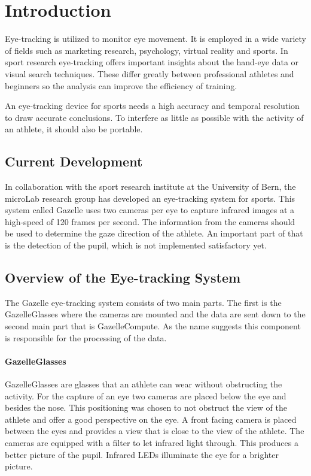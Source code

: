 \chapter{Introduction}

\label{chap:introduction}
Eye-tracking is utilized to monitor eye movement. It is employed in a wide variety of fields such as marketing research, psychology, virtual reality and sports. In sport research eye-tracking offers important insights about the hand-eye data or visual search techniques. These differ greatly between professional athletes and beginners so the analysis can improve the efficiency of training. 

An eye-tracking device for sports needs a high accuracy and temporal resolution to draw accurate conclusions. To interfere as little as possible with the activity of an athlete, it should also be portable. 

\section{Current Development}
In collaboration with the sport research institute at the University of Bern, the microLab research group has developed an eye-tracking system for sports. This system called Gazelle uses two cameras per eye to capture infrared images at a high-speed of 120 frames per second. The information from the cameras should be used to determine the gaze direction of the athlete. An important part of that is the detection of the pupil, which is not implemented satisfactory yet.

\section{Overview of the Eye-tracking System}
The Gazelle eye-tracking system consists of two main parts. The first is the GazelleGlasses where the cameras are mounted and the data are sent down to the second main part that is GazelleCompute. As the name suggests this component is responsible for the processing of the data.

\subsubsection{GazelleGlasses}
GazelleGlasses are glasses that an athlete can wear without obstructing the activity.
For the capture of an eye two cameras are placed below the eye and besides the nose. This positioning was chosen to not obstruct the view of the athlete and offer a good perspective on the eye. A front facing camera is placed between the eyes and provides a view that is close to the view of the athlete. The cameras are equipped with a filter to let infrared light through. This produces a better picture of the pupil. Infrared LEDs illuminate the eye for a brighter picture.

